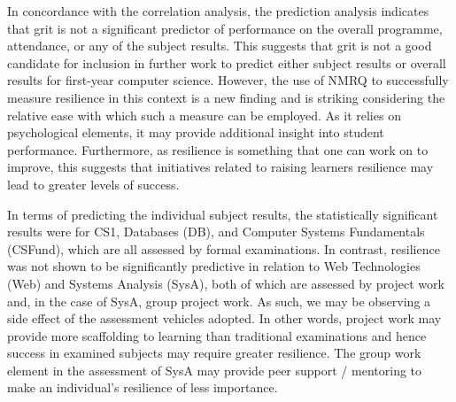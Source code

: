 \documentclass[sigconf]{acmart}
\begin{document}
In concordance with the correlation analysis, the prediction analysis indicates that grit is not a significant predictor of performance on the overall programme, attendance, or any of the subject results. This suggests that grit is not a good candidate for inclusion in further work to predict either subject results or overall results for first-year computer science.  However, the use of NMRQ to successfully measure resilience in this context is a new finding and is striking considering the relative ease with which such a measure can be employed. As it relies on psychological elements, it may provide additional insight into student performance. Furthermore, as resilience is something that one can work on to improve, this suggests that initiatives related to raising learners resilience may lead to greater levels of success. 



In terms of predicting the individual subject results, the statistically significant results were for CS1, Databases (DB), and Computer Systems Fundamentals (CSFund), which are all assessed by formal examinations. In contrast, resilience was not shown to be significantly predictive in relation to Web Technologies (Web) and Systems Analysis (SysA), both of which are assessed by project work and, in the case of SysA, group project work. As such, we may be observing a side effect of the assessment vehicles adopted. In other words, project work may provide more scaffolding to learning than traditional examinations and hence success in examined subjects may require greater resilience. The group work element in the assessment of SysA may provide peer support / mentoring to make an individual's resilience of less importance.    
\end{document}
